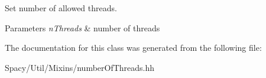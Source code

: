 Set number of allowed threads. 


\begin{DoxyParams}{Parameters}
{\em n\+Threads} & number of threads \\
\hline
\end{DoxyParams}


The documentation for this class was generated from the following file\+:\begin{DoxyCompactItemize}
\item 
Spacy/\+Util/\+Mixins/number\+Of\+Threads.\+hh\end{DoxyCompactItemize}
